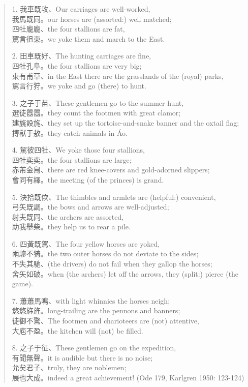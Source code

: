 \begin{quote}
1. 我車既攻、Our carriages are well-worked,\\
我馬既同。our horses are (assorted:) well matched;\\
四牡龐龐、the four stallions are fat,\\
駕言徂東。we yoke them and march to the East.

2. 田車既好、The hunting carriages are fine,\\
四牡孔阜。the four stallions are very big;\\
東有甫草、in the East there are the grasslands of the (royal) parks,\\
駕言行狩。we yoke and go (there) to hunt.

3. 之子于苗、These gentlemen go to the summer hunt,\\
選徒囂囂。they count the footmen with great clamor;\\
建旐設旄、they set up the tortoise-and-snake banner and the oxtail
flag;\\
搏獸于敖。they catch animals in Áo.

4. 駕彼四牡、We yoke those four stallions,\\
四牡奕奕。the four stallions are large;\\
赤芾金舄、there are red knee-covers and gold-adorned slippers;\\
會同有繹。the meeting (of the princes) is grand.

5. 決拾既佽、The thimbles and armlets are (helpful:) convenient,\\
弓矢既調。the bows and arrows are well-adjusted;\\
射夫既同、the archers are assorted,\\
助我舉柴。they help us to rear a pile.

6. 四黃既駕、The four yellow horses are yoked,\\
兩驂不猗。the two outer horses do not deviate to the sides;\\
不失其馳、(the drivers) do not fail when they gallop the horses;\\
舍矢如破。when (the archers) let off the arrows, they (split:) pierce
(the game).

7. 蕭蕭馬鳴、with light whinnies the horses neigh;\\
悠悠旆旌。long-trailing are the pennons and banners;\\
徒御不驚、The footmen and charioteers are (not) attentive,\\
大庖不盈。the kitchen will (not) be filled.

8. 之子于征、These gentlemen go on the expedition,\\
有聞無聲。it is audible but there is no noise;\\
允矣君子、truly, they are noblemen;\\
展也大成。indeed a great achievement! (Ode 179, Karlgren 1950: 123-124)
\end{quote}

